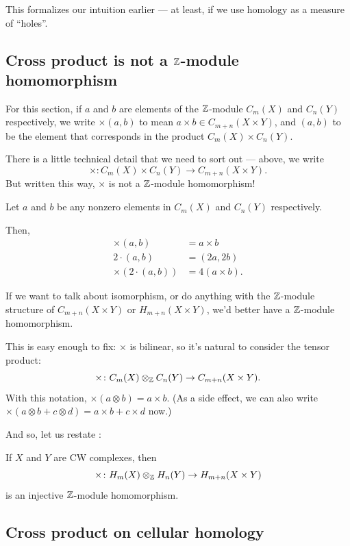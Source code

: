This formalizes our intuition earlier --- at least, if we use homology as a measure of ``holes''.

\subsection{Cross product is not a $\mathbb Z$-module homomorphism}

For this section, if $a$ and $b$ are elements of the $\mathbb Z$-module $C_m(X)$ and $C_n(Y)$ respectively,
we write $\times(a, b)$ to mean $a \times b \in C_{m + n}(X \times Y)$, and $(a, b)$
to be the element that corresponds in the product $C_m(X) \times C_n(Y)$.

There is a little technical detail that we need to sort out --- above, we write
\[ \times \colon C_m(X) \times C_n(Y) \to C_{m + n}(X \times Y). \]
But written this way, $\times$ is not a $\mathbb Z$-module homomorphism!

\begin{example}
	Let $a$ and $b$ be any nonzero elements in $C_m(X)$ and $C_n(Y)$ respectively.

	Then,
	\begin{align*}
		\times(a, b) &= a \times b \\
		2 \cdot (a, b) &= (2a, 2b) \\
		\times(2 \cdot (a, b)) &= 4(a \times b).
	\end{align*}
\end{example}

If we want to talk about isomorphism, or do anything with the $\mathbb Z$-module structure of $C_{m + n}(X
\times Y)$ or $H_{m + n}(X \times Y)$, we'd better have a $\mathbb Z$-module homomorphism.

This is easy enough to fix: $\times$ is bilinear, so it's natural to consider the tensor product:
\[ \times \colon C_m(X) \otimes_\mathbb Z C_n(Y) \to C_{m + n}(X \times Y). \]
With this notation, $\times(a \otimes b) = a \times b$.
(As a side effect, we can also write
$\times(a \otimes b + c \otimes d) = a \times b + c \times d$ now.)

And so, let us restate :
\begin{theorem}
	If $X$ and $Y$ are CW complexes, then
	\[ \times \colon H_m(X) \otimes_\mathbb Z H_n(Y) \to H_{m + n}(X \times Y) \]
	is an injective $\mathbb Z$-module homomorphism.
\end{theorem}

\subsection{Cross product on cellular homology}

